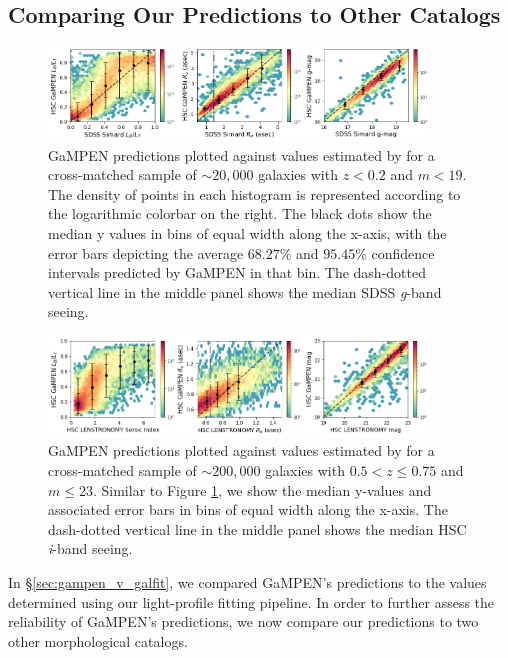 \documentclass[linenumbers,twocolumn,twocolappendix]{aastex631}
\newcommand\gampen{GaMPEN}
\newcommand\gb{\textit{g}}
\newcommand\ib{\textit{i}}
\begin{document}
\begin{CJK*}{UTF8}{gbsn}
\section{Comparing Our Predictions to Other Catalogs} \label{sec:compare}

\begin{figure}[htb]
    \centering
    \includegraphics[width = 0.9\textwidth]{gampen_v_simard.png}
    \caption{\gampen{} predictions plotted against values estimated by \citet{simard_11} for a cross-matched sample of $\sim20,000$ galaxies with $z < 0.2$ and $m < 19$. The density of points in each histogram is represented according to the logarithmic colorbar on the right. The black dots show the median y values in bins of equal width along the x-axis, with the error bars depicting the average $68.27\%$ and $95.45\%$ confidence intervals predicted by \gampen{} in that bin. The dash-dotted vertical line in the middle panel shows the median SDSS \gb{}-band seeing.}
    \label{fig:gampen_v_simard}
\end{figure}

\begin{figure}[htb]
    \centering
    \includegraphics[width = 0.9\textwidth]{gampen_v_lenstronomy.png}
    \caption{\gampen{} predictions plotted against values estimated by \citet{hsc_sersic} for a cross-matched sample of $\sim200,000$ galaxies with $0.5 < z \leq 0.75$ and $m \leq 23$. Similar to Figure \ref{fig:gampen_v_simard}, we show the median y-values and associated error bars in bins of equal width along the x-axis. The dash-dotted vertical line in the middle panel shows the median HSC \ib{}-band seeing.}
    \label{fig:gampen_v_lenstronomy}
\end{figure}

In \S \ref{sec:gampen_v_galfit}, we compared \gampen{}'s predictions to the values determined using our light-profile fitting pipeline. In order to further assess the reliability of \gampen{}'s predictions, we now compare our predictions to two other morphological catalogs. 


\end{CJK*}
\end{document}
